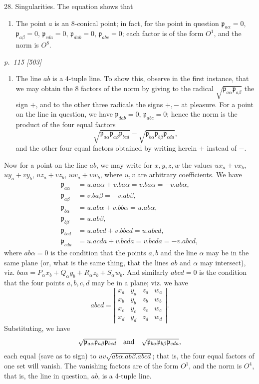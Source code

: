 \documentclass[11pt,a4paper]{article}
\newcommand{\sourcepage}[2]{%
  \bigskip
  \noindent\textit{p.~#1 [#2]}%
  \par\smallskip
}
\newcommand{\Det}[1]{\left|\begin{matrix}#1\end{matrix}\right|}
\newcommand{\p}{\mathfrak p}
\begin{document}
28. Singularities. The equation shows that
\begin{enumerate}
\item[(0)] The point $a$ is an 8-conical point; in fact, for the point in question
$\p_{a\alpha}=0$, $\p_{a\beta}=0$, $\p_{cda}=0$, $\p_{dab}=0$, $\p_{abc}=0$;
each factor is of the form $O^1$, and the norm is $O^8$.
\end{enumerate}

\sourcepage{115}{503}
\begin{enumerate}
\item[(1)] The line $ab$ is a 4-tuple line. To show this, observe in the first
instance, that we may obtain the 8 factors of the norm by giving to the radical
$\sqrt{\p_{a\alpha}\p_{a\beta}}$ the sign $+$, and to the other three radicals the
signs $+,-$ at pleasure. For a point on the line in question, we have
$\p_{dab}=0$, $\p_{abc}=0$; hence the norm is the product of the four equal factors
\[
\sqrt{\p_{a\alpha}\p_{a\beta}\p_{bcd}}
-\sqrt{\p_{b\alpha}\p_{b\beta}\p_{cda}},
\]
and the other four equal factors obtained by writing herein $+$ instead of $-$.
\end{enumerate}

Now for a point on the line $ab$, we may write for $x,y,z,w$ the values
$ux_a+vx_b$, $uy_a+vy_b$, $uz_a+vz_b$, $uw_a+vw_b$, where $u,v$ are arbitrary
coefficients. We have
\[
\begin{aligned}
\p_{a\alpha}&=u.aa\alpha+v.ba\alpha=v.ba\alpha=-v.ab\alpha,\\
\p_{a\beta}&=v.ba\beta=-v.ab\beta,\\
\p_{b\alpha}&=u.ab\alpha+v.bb\alpha=u.ab\alpha,\\
\p_{b\beta}&=u.ab\beta,\\
\p_{bcd}&=u.abcd+v.bbcd=u.abcd,\\
\p_{cda}&=u.acda+v.bcda=v.bcda=-v.abcd,
\end{aligned}
\]
where $ab\alpha=0$ is the condition that the points $a,b$ and the line $\alpha$
may be in the same plane (or, what is the same thing, that the lines $ab$ and
$\alpha$ may intersect), viz.
$ba\alpha=P_\alpha x_b+Q_\alpha y_b+R_\alpha z_b+S_\alpha w_b$. And similarly
$abcd=0$ is the condition that the four points $a,b,c,d$ may be in a plane; viz.
we have
\[
abcd=\Det{x_a&y_a&z_a&w_a\\
x_b&y_b&z_b&w_b\\
x_c&y_c&z_c&w_c\\
x_d&y_d&z_d&w_d}.
\]
Substituting, we have
\[
\sqrt{\p_{a\alpha}\p_{a\beta}\p_{bcd}}
\quad\hbox{and}\quad
\sqrt{\p_{b\alpha}\p_{b\beta}\p_{cda}},
\]
each equal (save as to sign) to $uv\sqrt{ab\alpha.ab\beta.abcd}$; that is, the four
equal factors of one set will vanish. The vanishing factors are of the form $O^1$,
and the norm is $O^4$, that is, the line in question, $ab$, is a 4-tuple line.
\end{document}
